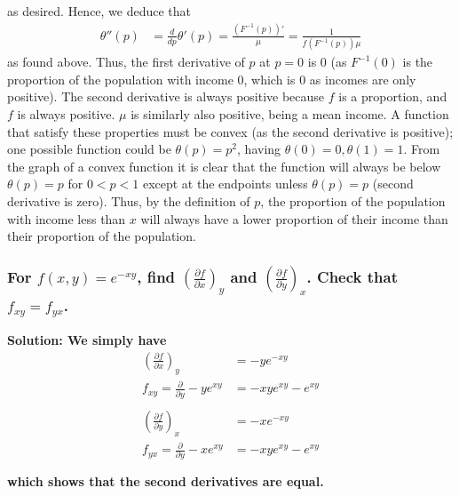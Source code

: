 \documentclass{article}
\begin{document}
as desired. Hence, we deduce that
\begin{equation*}
    \begin{aligned}
        \theta''(p) &= \frac{d}{dp} \theta'(p) = \frac{(F^{-1}(p))'}{\mu} = \frac{1}{f(F^{-1}(p))\mu}
    \end{aligned}
\end{equation*}
as found above. Thus, the first derivative of $p$ at $p = 0$ is 0 (as $F^{-1}(0)$ is the proportion of the population with income 0, which is 0 as incomes are only positive). The second derivative is always positive because $f$ is a proportion, and $f$ is always positive. $\mu$ is similarly also positive, being a mean income. 
A function that satisfy these properties must be convex (as the second derivative is positive); one possible function could be $\theta(p) = p^2$, having $\theta(0) = 0, \theta(1) = 1$. From the graph of a convex function it is clear that the function will always be below $\theta(p) = p$ for $0<p<1$ except at the endpoints unless $\theta(p)=p$ (second derivative is zero). Thus, by the definition of $p$, the proportion of the population with income less than $x$ will always have a lower proportion of their income than their proportion of the population.

\hrulefill
\subsubsection*{For $f(x,y) = e^{-xy}$, find $(\frac{\partial f}{\partial x})_y$ and $(\frac{\partial f}{\partial y})_x$. Check that $f_{xy} = f_{yx}$.}
\bf Solution:
\normalfont We simply have
\begin{equation*}
    \begin{aligned}
        (\frac{\partial f}{\partial x})_y &= -ye^{-xy} \\
        f_{xy} = \frac{\partial}{\partial y} -ye^{xy} &= -xye^{xy} - e^{xy} \\ \\
        (\frac{\partial f}{\partial y})_x &= -xe^{-xy} \\
        f_{yx} = \frac{\partial}{\partial y} -xe^{xy} &= -xye^{xy} - e^{xy} \\ \\
    \end{aligned}
\end{equation*}
which shows that the second derivatives are equal.

\hrulefill
\end{document}
